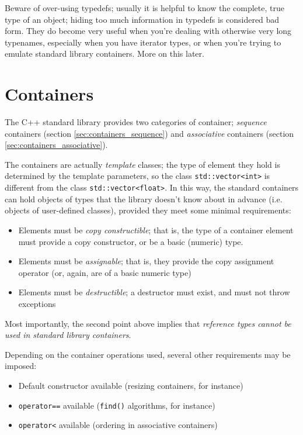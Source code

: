 \documentclass[a4paper]{scrartcl}
\begin{document}
Beware of over-using typedefs; usually it is helpful to know the complete, true type of an object; hiding too much information in typedefs is considered bad form. They do become very useful when you're dealing with otherwise very long typenames, especially when you have iterator types, or when you're trying to emulate standard library containers. More on this later.

\section{Containers}\label{sec:containers}
The C++ standard library provides two categories of container; \emph{sequence} containers (section \ref{sec:containers_sequence}) and \emph{associative} containers (section \ref{sec:containers_associative}).

The containers are actually \emph{template} classes; the type of element they hold is determined by the template parameters, so the class \verb|std::vector<int>| is different from the class \verb|std::vector<float>|. In this way, the standard containers can hold objects of types that the library doesn't know about in advance (i.e. objects of user-defined classes), provided they meet some minimal requirements:
\begin{itemize}
	\item Elements must be \emph{copy constructible}; that is, the type of a container element must provide a copy constructor, or be a basic (numeric) type.
	\item Elements must be \emph{assignable}; that is, they provide the copy assignment operator (or, again, are of a basic numeric type)
	\item Elements must be \emph{destructible}; a destructor must exist, and must not throw exceptions
\end{itemize}

Most importantly, the second point above implies that \emph{reference types cannot be used in standard library containers}.

Depending on the container operations used, several other requirements may be imposed:
\begin{itemize}
	\item Default constructor available (resizing containers, for instance)
	\item \verb|operator==| available (\verb|find()| algorithms, for instance)
	\item \verb|operator<| available (ordering in associative containers)
\end{itemize}
\end{document}
